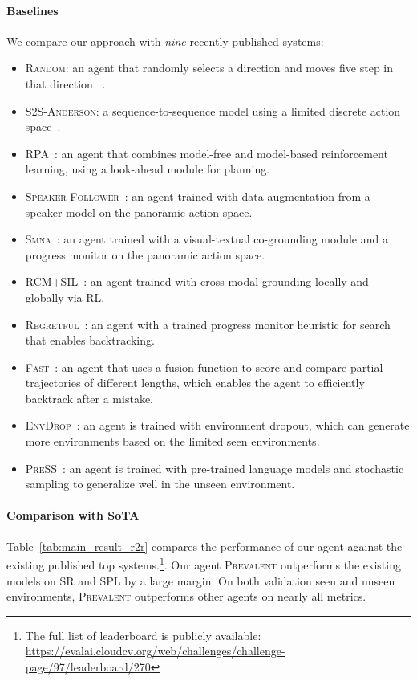 \documentclass[10pt,twocolumn,letterpaper]{article}
\newcommand{\short}{\textsc{Prevalent}}
\begin{document}
\paragraph{Baselines}
We compare our approach with \emph{nine} recently published systems:\begin{itemize}[noitemsep,topsep=0pt]
\item \textsc{Random}: an agent that randomly selects a direction and moves five step in that direction ~\cite{anderson2018vision}. 
\item \textsc{S2S-Anderson}: a sequence-to-sequence model using a limited discrete action space~\cite{anderson2018vision}.
\item \textsc{RPA}~\cite{wang2018look}: an agent that combines model-free and model-based reinforcement learning, using a look-ahead module for planning. 
\item \textsc{Speaker-Follower}~\cite{fried2018speaker}: an agent trained with data augmentation from a speaker model on the panoramic action space.
\item \textsc{Smna}~\cite{ma2019self}: an agent trained with a visual-textual co-grounding module and a progress monitor on the panoramic action space.
\item \textsc{RCM+SIL}~\cite{wang2018reinforced}: an agent trained with cross-modal grounding locally and globally via RL.
\item \textsc{Regretful}~\cite{ma2019regretful}: an agent with a trained progress monitor heuristic for search that enables backtracking. 
\item \textsc{Fast}~\cite{ke2019tactical}: an agent that uses a fusion function to score and compare partial trajectories of different lengths, which enables the agent to efficiently backtrack after a mistake.
\item \textsc{EnvDrop}~\cite{tan2019learning}: an agent is trained with environment dropout, which can generate more environments based on the limited seen environments. 
\item \textsc{PreSS}~\cite{li2019robust}: an agent is trained with pre-trained language models and stochastic sampling to generalize well in the unseen environment.
\end{itemize}


\paragraph{Comparison with SoTA}
Table~\ref{tab:main_result_r2r} compares the performance of our agent against the existing published top systems.\footnote{The full list of leaderboard is publicly available: \url{https://evalai.cloudcv.org/web/challenges/challenge-page/97/leaderboard/270}}. Our agent \short{} outperforms the existing models on SR and SPL by a large margin. On both validation seen and unseen environments, \short{} outperforms other agents on nearly all metrics. 
\end{document}
